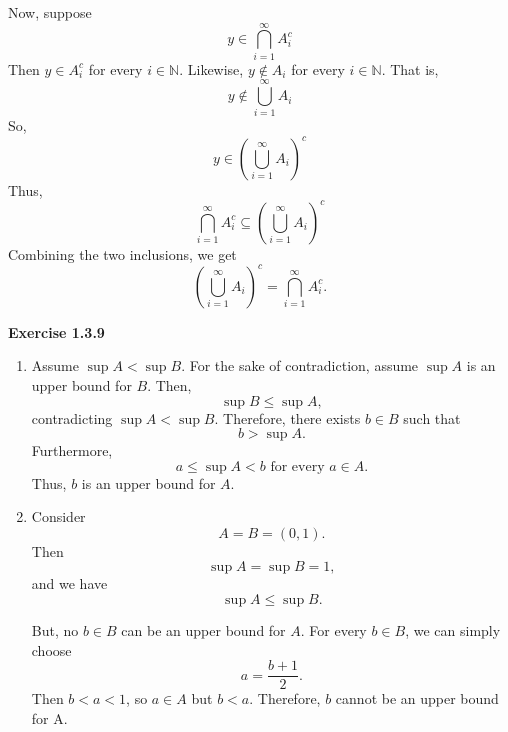 \documentclass[12pt]{article}
\begin{document}
\begin{enumerate}
            Now, suppose
            \[
                  y \in \bigcap_{i=1}^{\infty} A_i^c
            \]
            Then $y \in A_i^c$ for every $ i \in \mathbb{N}$.
            Likewise, $y \notin A_i$ for every $ i \in \mathbb{N}$.
            That is,
            \[
                  y \notin \bigcup_{i=1}^{\infty} A_i
            \]
            So,
            \[
                  y \in \left(\bigcup_{i=1}^{\infty} A_i\right)^c
            \]
            Thus,
            \[
                  \bigcap_{i=1}^{\infty} A_i^c \subseteq \left(\bigcup_{i=1}^{\infty} A_i\right)^c
            \]
            Combining the two inclusions, we get
            \[
                  \left(\bigcup_{i=1}^{\infty} A_i\right)^c = \bigcap_{i=1}^{\infty} A_i^c.
            \]
\end{enumerate}

\noindent{} \textbf{Exercise 1.3.9}
\begin{enumerate}
      \item [(a)] Assume $\sup A < \sup B$.
            For the sake of contradiction,  assume $\sup A$ is an upper bound for $B$.
            Then,
            \[
                  \sup B \leq \sup A,
            \]
            contradicting $\sup A < \sup B$.
            Therefore, there exists $b \in B$ such that
            \[
                  b > \sup A.
            \]
            Furthermore,
            \[
                  a \leq \sup A < b \text{ for every } a \in A.
            \]
            Thus, $b$ is an upper bound for $A$.
      \item [(b)]
            Consider
            \[
                  A = B = (0, 1).
            \]
            Then
            \[
                  \sup A = \sup B = 1,
            \]
            and we have
            \[
                  \sup A \leq \sup B.
            \]

            But, no $b \in B$ can be an upper bound for $A$.
            For every $b \in B$, we can simply choose
            \[
                  a = \frac{b+1}{2}.
            \]
            Then $b < a < 1$, so $a \in A$ but $b < a$.
            Therefore, $b$ cannot be an upper bound for A.

\end{enumerate}
\end{document}
